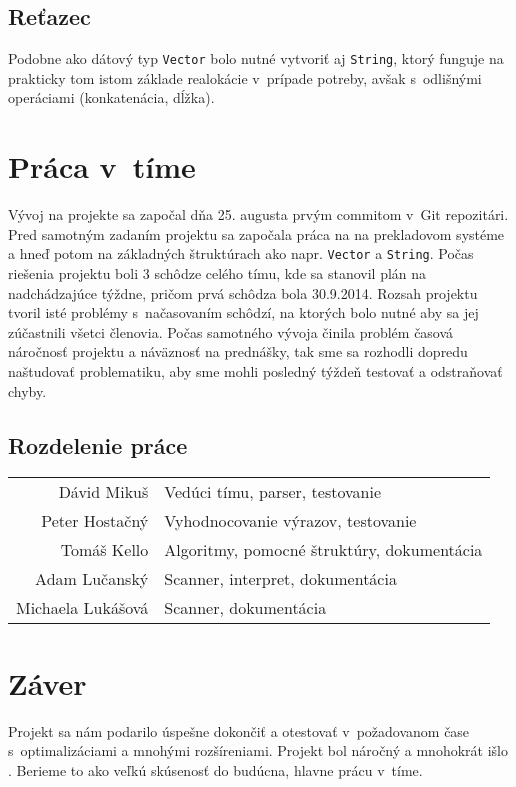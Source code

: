 \documentclass[12pt,a4paper,titlepage,final]{article}
\begin{document}
\subsection{Reťazec}
Podobne ako dátový typ \texttt{Vector} bolo nutné vytvoriť aj \texttt{String},
ktorý funguje na prakticky tom istom základe realokácie v~prípade potreby,
avšak s~odlišnými operáciami (konkatenácia, dĺžka).


\section{Práca v~tíme}
Vývoj na projekte sa započal dňa 25. augusta prvým commitom v~Git repozitári.
 Pred samotným zadaním projektu sa započala práca na na prekladovom systéme
 a hneď potom na základných štruktúrach ako 
 napr. \texttt{Vector} a \texttt{String}.
Počas riešenia projektu boli 3 schôdze celého tímu, kde sa stanovil plán na
nadchádzajúce týždne, pričom prvá schôdza bola 30.9.2014.
Rozsah projektu tvoril isté problémy s~načasovaním schôdzí, na ktorých bolo
nutné aby sa jej zúčastnili všetci členovia. Počas samotného vývoja
činila problém časová náročnosť projektu a náväznosť na prednášky, tak sme sa
rozhodli dopredu naštudovať problematiku, aby sme mohli posledný týždeň testovať
a odstraňovať chyby.

\subsection{Rozdelenie práce}
\begin{table}[H]
	\centering
	\begin{tabular}{rl}
		Dávid Mikuš        & Vedúci tímu, parser, testovanie \\
		Peter Hostačný     & Vyhodnocovanie výrazov, testovanie \\
		Tomáš Kello        & Algoritmy, pomocné štruktúry, dokumentácia \\
		Adam Lučanský      & Scanner, interpret, dokumentácia \\
		Michaela Lukášová  & Scanner, dokumentácia
	\end{tabular}
\end{table}

\section{Záver}
Projekt sa nám podarilo úspešne dokončiť a otestovať v~požadovanom čase
s~optimalizáciami a mnohými rozšíreniami. Projekt bol náročný a mnohokrát 
išlo . Berieme to ako veľkú skúsenosť do budúcna, hlavne
prácu v~tíme.
\end{document}
